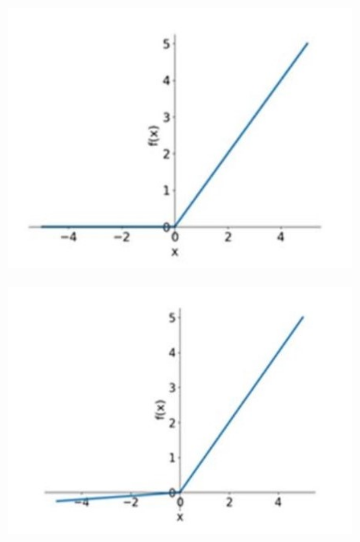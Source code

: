 \begin{figure}[h!]
\begin{subfigure}{0.22\textwidth}
		\label{subfig:Tanh}
	\end{subfigure}
	\hfill
	\begin{subfigure}{0.22\textwidth}
		\includegraphics[width=\linewidth]{Images/DataMining/ReLUFunction}
		\caption{}    %
		\label{subfig:ReLU}
	\end{subfigure}
	\hfill
	\begin{subfigure}{0.22\textwidth}
		\includegraphics[width=\linewidth]{Images/DataMining/LeakyReLUFunction}
		\caption{}    %
		\label{subfig:LeakyReLU}
	\end{subfigure}
	

\end{figure}
